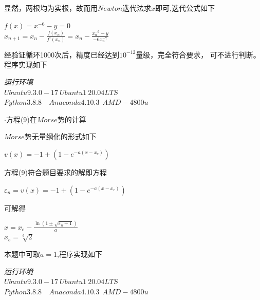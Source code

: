 \documentclass[11pt, a4paper, oneside]{ctexart}
\begin{document}
{{{{    显然，两根均为实根，故而用$Newton$迭代法求$x$即可,迭代公式如下
    \begin{center}
        $f(x)=x^{-6}-y=0$\\
        $x_{n+1}=x_{n}-{\frac {f(x_{n})}{f'(x_{n})}}=x_{n}-{\frac {x_{n}^{-6}-y}{-6x_{n}^{-7}}}$
    \end{center}
    
    
    经验证循环1000次后，精度已经达到$10^{-12}$量级，完全符合要求，
    可不进行判断。程序实现如下\\
    }

    {
        \begin{flushright}
            \scriptsize\emph{运行环境\\$Ubuntu 9.3.0-17\ Ubuntu1~20.04LTS$}\\
            \scriptsize\emph{$Python 3.8.8$\ \ $Anaconda 4.10.3\ \  AMD-4800u$}
                
            \end{flushright}
    }

}

{
    $\cdot $方程(9)在$Morse$势的计算
    

    \setlength{\parindent}{2em}$Morse$势无量纲化的形式如下
    \begin{center}
        $v(x)=-1+(1-e^{-a(x-x_{e})})$
    \end{center}

    方程(9)符合题目要求的解即方程
    \begin{center}
        $\varepsilon_n =v(x)=-1+(1-e^{-a(x-x_{e})})$
    \end{center}


    可解得
    \begin{center}
        $x=x_e- \frac{\ln(1\pm \sqrt{\varepsilon_n+1})}{a} $\\
        $x_e={\sqrt[6]{2} }$
    \end{center}
    

    {本题中可取$a=1$,程序实现如下}

    {    \begin{flushright}
    \scriptsize\emph{运行环境\\$Ubuntu 9.3.0-17\ Ubuntu1~20.04LTS$}\\
    \scriptsize\emph{$Python 3.8.8$\ \ $Anaconda 4.10.3\ \  AMD-4800u$}
        
    \end{flushright}

}}}}
\end{document}
